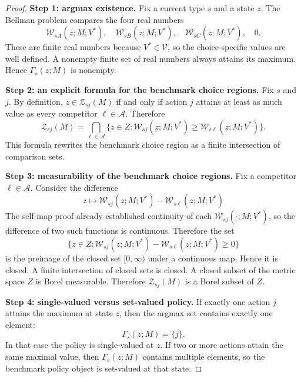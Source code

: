 \begin{proof}
\medskip\noindent\textbf{Step 1: argmax existence.}
Fix a current type $s$ and a state $z$. The Bellman problem compares the four real numbers
\[
\mathcal W_{sA}(z;M;V^*),\quad
\mathcal W_{sB}(z;M;V^*),\quad
\mathcal W_{sC}(z;M;V^*),\quad
0.
\]
These are finite real numbers because $V^*\in\mathcal V$, so the choice-specific values are well defined. A nonempty finite set of real numbers always attains its maximum. Hence $\Gamma_s(z;M)$ is nonempty.

\medskip\noindent\textbf{Step 2: an explicit formula for the benchmark choice regions.}
Fix $s$ and $j$. By definition, $z\in\mathcal Z_{sj}(M)$ if and only if action $j$ attains at least as much value as every competitor $\ell\in\mathcal A$. Therefore
\[
\mathcal Z_{sj}(M)
=
\bigcap_{\ell\in\mathcal A}
\{z\in Z:\mathcal W_{sj}(z;M;V^*)\ge \mathcal W_{s\ell}(z;M;V^*)\}.
\]
This formula rewrites the benchmark choice region as a finite intersection of comparison sets.

\medskip\noindent\textbf{Step 3: measurability of the benchmark choice regions.}
Fix a competitor $\ell\in\mathcal A$. Consider the difference
\[
z\mapsto \mathcal W_{sj}(z;M;V^*)-\mathcal W_{s\ell}(z;M;V^*)
\]
The self-map proof already established continuity of each $\mathcal W_{sj}(\cdot;M;V^*)$, so the difference of two such functions is continuous. Therefore the set
\[
\{z\in Z:\mathcal W_{sj}(z;M;V^*)-\mathcal W_{s\ell}(z;M;V^*)\ge 0\}
\]
is the preimage of the closed set $[0,\infty)$ under a continuous map. Hence it is closed. A finite intersection of closed sets is closed. A closed subset of the metric space $Z$ is Borel measurable. Therefore $\mathcal Z_{sj}(M)$ is a Borel subset of $Z$.

\medskip\noindent\textbf{Step 4: single-valued versus set-valued policy.}
If exactly one action $j$ attains the maximum at state $z$, then the argmax set contains exactly one element:
\[
\Gamma_s(z;M)=\{j\}.
\]
In that case the policy is single-valued at $z$. If two or more actions attain the same maximal value, then $\Gamma_s(z;M)$ contains multiple elements, so the benchmark policy object is set-valued at that state.


\end{proof}
